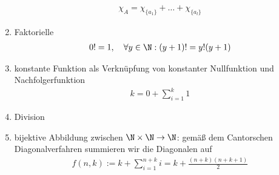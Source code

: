 \begin{solution}
\begin{enumerate}
			\begin{align*}
			\chi_A = \chi_{\{a_1\}} + \dots + \chi_{\{a_l\}}
			\end{align*}
		\item Faktorielle
			\begin{align*}
			0! = 1, \quad \forall y \in \N: (y + 1)! = y! (y + 1)
			\end{align*}
		\item konstante Funktion als Verknüpfung von konstanter Nullfunktion und Nachfolgerfunktion
			\begin{align*}
			k = 0 + \sum_{i = 1}^k 1
			\end{align*}
		\item Division
		\item bijektive Abbildung zwischen $\N \times \N \to \N$: gemäß dem Cantorschen Diagonalverfahren summieren wir die Diagonalen auf
			\begin{align*}
			f(n,k) := k + \sum_{i = 1}^{n + k} i = k + \frac{(n + k) (n + k + 1)}{2}
			\end{align*}
	\end{enumerate}

\end{solution}
